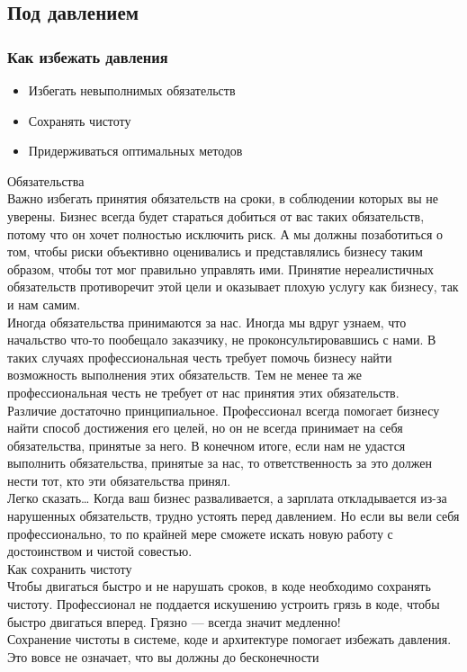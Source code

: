 \documentclass{../industrial-development}
\begin{document}
\subsection{Под давлением}
\begin{frame} \frametitle{Как избежать давления}
\begin{itemize}
  \item Избегать невыполнимых обязательств
  \item Сохранять чистоту
	\item Придерживаться оптимальных методов
\end{itemize}
\end{frame}
\lecturenotes
Обязательства\\
Важно избегать принятия обязательств на сроки, в соблюдении которых вы не уверены. Бизнес всегда будет стараться добиться от вас таких обязательств, потому что он хочет полностью исключить риск. А мы должны позаботиться о том, чтобы риски объективно оценивались и  представлялись бизнесу таким образом, чтобы тот мог правильно управлять ими. Принятие нереалистичных обязательств противоречит этой цели и оказывает плохую услугу как бизнесу, так и нам самим.\\
Иногда обязательства принимаются за нас. Иногда мы вдруг узнаем, что начальство что-то пообещало заказчику, не проконсультировавшись с нами. В таких случаях профессиональная честь требует помочь бизнесу найти возможность выполнения этих обязательств. Тем не менее та же профессиональная честь не требует от нас принятия этих обязательств.\\
Различие достаточно принципиальное. Профессионал всегда помогает бизнесу найти способ достижения его целей, но он не всегда принимает на себя обязательства, принятые за него. В конечном итоге, если нам не удастся выполнить обязательства, принятые за нас, то ответственность за это должен нести тот, кто эти обязательства принял.\\
Легко сказать… Когда ваш бизнес разваливается, а зарплата откладывается из-за нарушенных обязательств, трудно устоять перед давлением. Но если вы вели себя профессионально, то по крайней мере сможете искать новую работу с достоинством и чистой совестью.\\
Как сохранить чистоту\\
Чтобы двигаться быстро и не нарушать сроков, в коде необходимо сохранять чистоту. Профессионал не поддается искушению устроить грязь в коде, чтобы быстро двигаться вперед. Грязно — всегда значит медленно!\\
Сохранение чистоты в системе, коде и архитектуре помогает избежать давления. Это вовсе не означает, что вы должны до бесконечности
\end{document}
